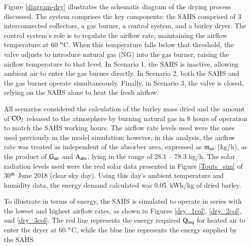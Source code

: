 Figure \ref{diagram-dry} illustrates the schematic diagram of the drying process discussed. The system comprises the key components: the SAHS comprised of 3 interconnected collectors, a gas burner, a control system, and a barley dryer. The control system's role is to regulate the airflow rate, maintaining the airflow temperature at 60 $^{\rm{o}}$C. When this temperature falls below that threshold, the valve adjusts to introduce natural gas (NG) into the gas burner, raising the airflow temperature to that level. In Scenario 1, the SAHS is inactive, allowing ambient air to enter the gas burner directly. In Scenario 2, both the SAHS and the gas burner operate simultaneously. Finally, in Scenario 3, the valve is closed, relying on the SAHS alone to heat the fresh airflow.


All scenarios considered the calculation of the barley mass dried and the amount of $\rm{CO_2}$ released to the atmosphere by burning natural gas in 8 hours of operation to match the SAHS working hours. The airflow rate levels used were the ones used previously in the model simulation; however, in this analysis, the airflow rate was treated as independent of the absorber area, expressed as $\rm{m_{air}}$ (kg/h), as the product of $\rm{G_{air}}$ and $\rm{A_{abs}}$, lying in the range of 28.1 -- 78.3 kg/h. The solar radiation levels used were the real solar data presented in Figure \ref{Touts_sim} of 30$^{\rm th}$ June 2018 (clear sky day). Using this day's ambient temperature and humidity data, the energy demand calculated was 0.05~kWh/kg of dried barley.

To illustrate in terms of energy, the SAHS is simulated to operate in series with the lowest and highest airflow rates, as shown in Figures \ref{dry_1col}, \ref{dry_2col}, and \ref{dry_3col}. The red line represents the energy required $\rm{Q_{req}}$ for heated air to enter the dryer at 60 $^{\rm{o}}$C, while the blue line represents the energy supplied by the SAHS. 


